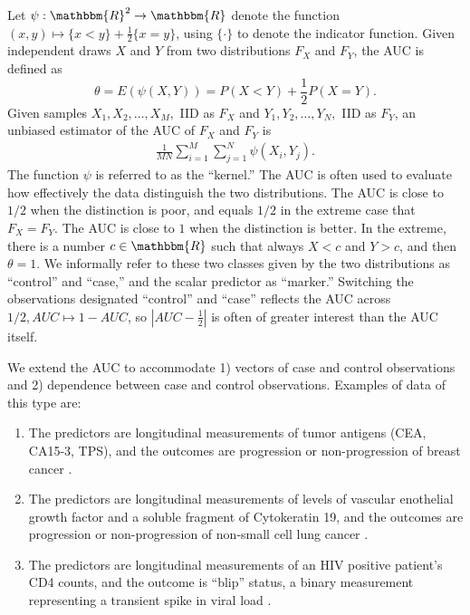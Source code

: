 \documentclass[12pt]{article}
\newcommand{\E}{E}
\renewcommand{\P}{P}
\newcommand{\kernel}{\psi}
\newcommand{\comment}[1]{
  \iftoggle{commenttoggle}{
    {\normalsize{\color{red}{ #1}}\normalsize}
  }
  {}
}
\begin{document}
Let $\kernel:\mathbbm{R}^2\to\mathbbm{R}$ denote the function
$(x,y)\mapsto\{x<y\}+\frac{1}{2}\{x=y\}$, using $\{\cdot\}$ to denote the indicator function. Given independent draws $X$ and $Y$ from two distributions $F_X$ and $F_Y$, the AUC is defined as
$$\theta=\E(\kernel(X,Y))=\P(X<Y)+\frac{1}{2}\P(X=Y).$$%
Given samples
$X_1,X_2,\ldots,X_M,$ IID as $F_X$ and $Y_1,Y_2,\ldots,Y_N,$ IID as
$F_Y$, an unbiased estimator of the AUC of $F_X$ and $F_Y$ is %
\begin{align}
  \frac{1}{MN}\sum_{i=1}^M\sum_{j=1}^N \psi(X_i,Y_j).
\end{align}
The function
$\kernel$ is referred to as the ``kernel.'' The AUC is often used to
evaluate how effectively the data distinguish the two
distributions. The AUC is close to
$1/2$ when the distinction is poor, and equals
$1/2$ in the extreme case that $F_X=F_Y$. The AUC is close to
$1$ when the distinction is better. In the extreme, there is a number
$c\in\mathbbm{R}$ such that always $X<c$ and
$Y>c$, and then
$\theta=1$. We informally refer to these two classes given by the two
distributions as ``control'' and ``case,'' and the scalar predictor as ``marker.'' %
 Switching the observations designated
``control'' and ``case'' reflects the AUC across $1/2, AUC\mapsto
1-AUC$, so
$|AUC-\frac{1}{2}|$ is often of greater interest than the AUC itself.



We extend the AUC to accommodate 1) vectors of case and control
observations and 2) dependence between case and control
observations. Examples of data of this type are:
\begin{enumerate}
\item The predictors are longitudinal measurements of tumor antigens
  (CEA, CA15-3, TPS), and the outcomes are progression or non-progression
  of breast cancer \citep{emir2000}.
\item The predictors are longitudinal measurements of levels of vascular
enothelial growth factor and a soluble fragment of Cytokeratin
19, and the outcomes are progression or non-progression of non-small cell
lung cancer \citep{wu2011}.
\item The predictors are longitudinal measurements of an HIV positive patient's CD4 counts, and the outcome is ``blip'' status, a binary measurement representing a transient spike in viral load \citep{michael2019}.
\end{enumerate}
\end{document}
